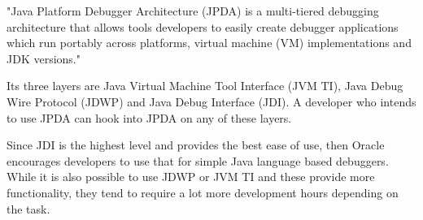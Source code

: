 \documentclass[..thesis.tex]{subfiles}
\begin{document}

"Java Platform Debugger Architecture (JPDA) is a multi-tiered debugging architecture that allows tools developers to easily create debugger applications which run portably across platforms, virtual machine (VM) implementations and JDK versions."\cite{oracle_jpda_spec} 

Its three layers are Java Virtual Machine Tool Interface (JVM TI), Java Debug Wire Protocol (JDWP) and Java Debug Interface (JDI). 
A developer who intends to use JPDA can hook into JPDA on any of these layers. \cite{oracle_jpda_spec} 



Since JDI is the highest level and provides the best ease of use, then Oracle encourages developers to use that for simple Java language based debuggers.\cite{oracle_jpda_spec}
While it is also possible to use JDWP or JVM TI and these provide more functionality, they tend to require a lot more development hours depending on the task. 
\end{document}
